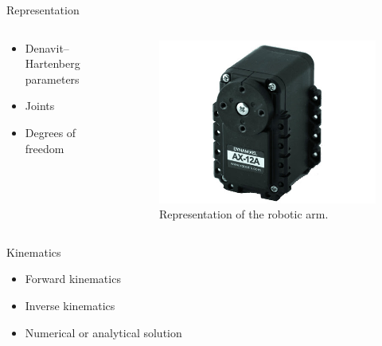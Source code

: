 \documentclass{beamer}
\begin{document}


\begin{frame}{Representation}

    \begin{columns}
        \begin{column}[]{0.5\textwidth}
            \begin{itemize}
                \item Denavit–Hartenberg parameters
                \item Joints
                \item Degrees of freedom
            \end{itemize}
        \end{column}
        
        
        \begin{column}[]{0.5\textwidth}
            \begin{figure}
                \centering
                \includegraphics[width = \textwidth]{img/ax12a.jpg}
                \caption{Representation of the robotic arm.}
                \label{fig:my_label}
            \end{figure}
            
        \end{column}
    \end{columns}
    
\end{frame}




\begin{frame}{Kinematics}

    \begin{itemize}
        \item Forward kinematics
        \item Inverse kinematics
        \item Numerical or analytical solution
    \end{itemize}
\end{frame}
\end{document}
